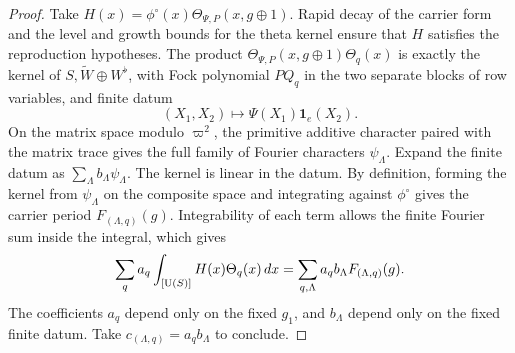 \begin{proof}
Take $H(x)=\phi^\circ(x)\Theta_{\Psi,P}(x,g\oplus1)$. Rapid decay of the carrier form and the level and growth bounds for the theta kernel ensure that $H$ satisfies the reproduction hypotheses. The product $\Theta_{\Psi,P}(x,g\oplus1)\Theta_q(x)$ is exactly the kernel of $S,\widetilde W\oplus W^\flat$, with Fock polynomial $P Q_q$ in the two separate blocks of row variables, and finite datum
\[
 (X_1,X_2)\longmapsto\Psi(X_1)\mathbf 1_e(X_2).
\]
On the matrix space modulo $\varpi^2$, the primitive additive character paired with the matrix trace gives the full family of Fourier characters $\psi_\Lambda$. Expand the finite datum as $\sum_\Lambda b_\Lambda\psi_\Lambda$. The kernel is linear in the datum. By definition, forming the kernel from $\psi_\Lambda$ on the composite space and integrating against $\phi^\circ$ gives the carrier period $F_{(\Lambda,q)}(g)$. Integrability of each term allows the finite Fourier sum inside the integral, which gives
\[
 \sum_q a_q\int_{[\operatorname{U}(S)]}H(x)\Theta_q(x)\,dx
 =\sum_{q,\Lambda} a_q b_\Lambda F_{(\Lambda,q)}(g).
\]
The coefficients $a_q$ depend only on the fixed $g_1$, and $b_\Lambda$ depend only on the fixed finite datum. Take $c_{(\Lambda,q)}=a_qb_\Lambda$ to conclude.
\end{proof}


